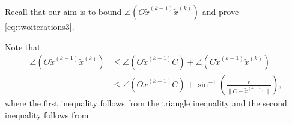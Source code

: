 \documentclass[11pt]{article}
\newcommand{\dist}{\text{dist}}
\begin{document}
Recall that our aim is to bound  $\angle(O\widetilde{x}^{(k-1)}\widetilde{x}^{(k)})$ and prove \eqref{eq:twoiterations3}.
{
Note that 
\begin{align}\label{eq:geometric1}
\angle(O\widetilde{x}^{(k-1)}\widetilde{x}^{(k)}) &\leq \angle(O\widetilde{x}^{(k-1)}C)+\angle(C\widetilde{x}^{(k-1)}\widetilde{x}^{(k)}) \nonumber \\
&\leq \angle(O\widetilde{x}^{(k-1)}C)+\sin^{-1}\left(\frac{r}{\|C - \widetilde{x}^{(k-1)}\|}\right),
\end{align} 
where the first inequality follows from the triangle inequality and the second inequality follows from 

}
\end{document}
